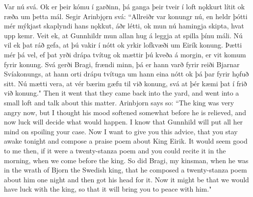 \begin{paracol}{2}
    Var nú svá. Ok er þeir kómu í garðinn, þá ganga þeir tveir í loft nǫkkurt lítit ok ræða um þetta mál. Segir Arinbjǫrn svá: ``Allreiðr var konungr nú, en heldr þótti mér mýkjast skaplyndi hans nǫkkut, áðr létti, ok mun nú hamingja skipta, hvat upp kemr. Veit ek, at Gunnhildr mun allan hug á leggja at spilla þínu máli. Nú vil ek þat ráð gefa, at þú vakir í nótt ok yrkir lofkvæði um Eirík konung. Þætti mér þá vel, ef þat yrði drápa tvítug ok mættir þú kveða á morgin, er vit komum fyrir konung. Svá gerði Bragi, frændi minn, þá er hann varð fyrir reiði Bjarnar Svíakonungs, at hann orti drápu tvítuga um hann eina nótt ok þá þar fyrir hǫfuð sitt. Nú mætti vera, at vér bærim gæfu til við konung, svá at þér kæmi þat í frið við konung."
    \switchcolumn
    Then it went that they came back into the yard, and went into a small loft and talk about this matter. Arinbjorn says so: ``The king was very angry now, but I thought his mood softened somewhat before he is relieved, and now luck will decide what would happen. I know that Gunnhild will put all her mind on spoiling your case. Now I want to give you this advice, that you stay awake tonight and compose a praise poem about King Eirik. It would seem good to me then, if it were a twenty-stanza poem and you could recite it in the morning, when we come before the king. So did Bragi, my kinsman, when he was in the wrath of Bjorn the Swedish king, that he composed a twenty-stanza poem about him one night and then got his head for it. Now it might be that we would have luck with the king, so that it will bring you to peace with him."
\end{paracol}

